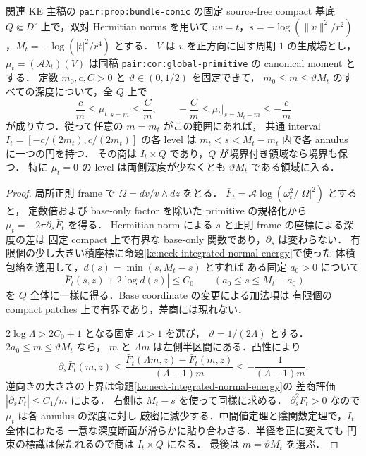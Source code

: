 \begin{proposition}
\label{ke:neck-deep-moment-strip}
関連 KE 主稿の \texttt{pair:prop:bundle-conic} の固定 source-free compact
基底 $Q\Subset D^\circ$ 上で，双対 Hermitian norms を用いて
$uv=t$，$s=-\log(\|v\|^2/r^2)$，$M_t=-\log(|t|^2/r^4)$ とする．
$V$ は $v$ を正方向に回す周期 $1$ の生成場とし，
$\mu_t=(\mathcal A\lambda_t)(V)$ は同稿 \texttt{pair:cor:global-primitive}
の canonical moment とする．
定数 $m_0,c,C>0$ と $\vartheta\in(0,1/2)$ を固定できて，
$m_0\le m\le\vartheta M_t$ のすべての深度について，全 $Q$ 上で
\[
 \frac c m\le\mu_t\big|_{s=m}\le\frac C m,
 \qquad
 -\frac C m\le\mu_t\big|_{s=M_t-m}\le-\frac c m
\]
が成り立つ．従って任意の $m=m_t$ がこの範囲にあれば，
共通 interval $I_t=[-c/(2m_t),c/(2m_t)]$ の各 level は
$m_t<s<M_t-m_t$ 内で各 annulus に一つの円を持つ．
その商は $I_t\times Q$ であり，$Q$ が境界付き領域なら境界も保つ．
特に $\mu_t=0$ の level は両側深度が少なくとも $\vartheta M_t$
である領域に入る．
\end{proposition}

\begin{proof}
局所正則 frame で $\Omega=dv/v\wedge dz$ をとる．
$\bar F_t=\mathcal A\log(\omega_t^2/|\Omega|^2)$ とすると，
定数倍および base-only factor を除いた primitive の規格化から
$\mu_t=-2\pi\partial_s\bar F_t$ を得る．
Hermitian norm による $s$ と正則 frame の座標による深度の差は
固定 compact 上で有界な base-only 関数であり，$\partial_s$ は変わらない．
有限個の少し大きい積座標に命題\ref{ke:neck-integrated-normal-energy}で使った
体積包絡を適用して，$d(s)=\min(s,M_t-s)$ とすれば
ある固定 $a_0>0$ について
\[
 |\bar F_t(s,z)+2\log d(s)|\le C_0
 \qquad (a_0\le s\le M_t-a_0)
\]
を $Q$ 全体に一様に得る．Base coordinate の変更による加法項は
有限個の compact patches 上で有界であり，差商には現れない．

$2\log\Lambda>2C_0+1$ となる固定 $\Lambda>1$ を選び，
$\vartheta=1/(2\Lambda)$ とする．$2a_0\le m\le\vartheta M_t$ なら，
$m$ と $\Lambda m$ は左側半区間にある．凸性により
\[
 \partial_s\bar F_t(m,z)
 \le\frac{\bar F_t(\Lambda m,z)-\bar F_t(m,z)}{(\Lambda-1)m}
 \le -\frac{1}{(\Lambda-1)m}.
\]
逆向きの大きさの上界は命題\ref{ke:neck-integrated-normal-energy}の
差商評価 $|\partial_s\bar F_t|\le C_1/m$ による．
右側は $M_t-s$ を使って同様に求める．
$\partial^2_s\bar F_t>0$ なので $\mu_t$ は各 annulus の深度に対し
厳密に減少する．中間値定理と陰関数定理で，$I_t$ 全体にわたる
一意な深度断面が滑らかに貼り合わさる．半径を正に変えても
円束の標識は保たれるので商は $I_t\times Q$ になる．
最後は $m=\vartheta M_t$ を選ぶ．
\end{proof}

